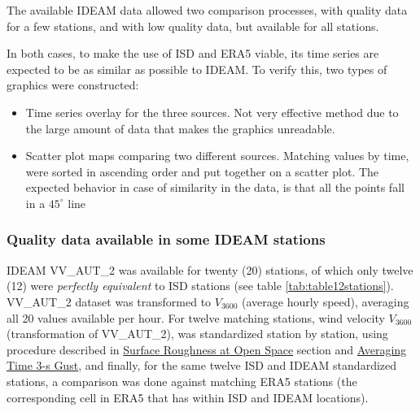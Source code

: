 \documentclass[12pt,oneside]{reedthesis}
\begin{document}
The available IDEAM data allowed two comparison processes, with quality data for a few stations, and with low quality data, but available for all stations.

In both cases, to make the use of ISD and ERA5 viable, its time series are expected to be as similar as possible to IDEAM. To verify this, two types of graphics were constructed:
\begin{itemize}
\item
  Time series overlay for the three sources. Not very effective method due to the large amount of data that makes the graphics unreadable.
\item
  Scatter plot maps comparing two different sources. Matching values by time, were sorted in ascending order and put together on a scatter plot. The expected behavior in case of similarity in the data, is that all the points fall in a \(45^\circ\) line
\end{itemize}
\hypertarget{quality-data-available-in-some-ideam-stations}{%
\subsubsection{Quality data available in some IDEAM stations}\label{quality-data-available-in-some-ideam-stations}}

IDEAM VV\_AUT\_2 was available for twenty (20) stations, of which only twelve (12) were \emph{perfectly equivalent} to ISD stations (see table \ref{tab:table12stations}). VV\_AUT\_2 dataset was transformed to \(V_{3600}\) (average hourly speed), averaging all 20 values available per hour. For twelve matching stations, wind velocity \(V_{3600}\) (transformation of VV\_AUT\_2), was standardized station by station, using procedure described in \protect\hyperlink{rmd-roughness}{Surface Roughness at Open Space} section and \protect\hyperlink{rmd-gust}{Averaging Time 3-s Gust}, and finally, for the same twelve ISD and IDEAM standardized stations, a comparison was done against matching ERA5 stations (the corresponding cell in ERA5 that has within ISD and IDEAM locations).
\end{document}
